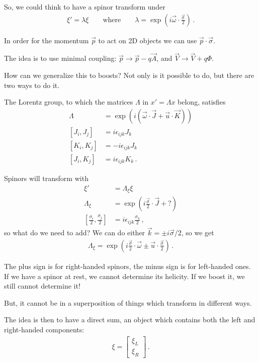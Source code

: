\documentclass[main.tex]{subfiles}
\begin{document}
So, we could think to have a spinor transform under 
%
\begin{align}
\xi ' = \lambda \xi  
\qquad \text{where} \qquad
\lambda = \exp(i \vec{\omega} \cdot \frac{\vec{\sigma}}{2})
\,.
\end{align}

In order for the momentum \(\vec{p}\) to act on 2D objects we can use \(\vec{p} \cdot \vec{\sigma}\). 

The idea is to use minimal coupling: \(\vec{p} \to \vec{p} - q \vec{A}\), and \(\vec{V} \to \vec{V} + q \Phi \). 

How can we generalize this to boosts? 
Not only is it possible to do, but there are two ways to do it. 

The Lorentz group, to which the matrices \(\Lambda \) in \(x' = \Lambda x \) belong, satisfies 
%
\begin{align}
\Lambda &= \exp(i \left(\vec{\omega} \cdot \vec{J} + \vec{u} \cdot \vec{K}\right)) \\
[J_i, J_j] &= i \epsilon_{ijk} J_k \\
[K_i, K_j] &= - i \epsilon_{ijk} J_k \\
[J_i, K_j] &= i \epsilon_{ijk} K_k 
\,.
\end{align}

Spinors will transform with 
%
\begin{align}
\xi ' &= \Lambda_\xi \xi  \\
\Lambda _\xi &= \exp(i \frac{\vec{\sigma}}{2} \cdot \vec{J} + ?)  \\
\left[\frac{\sigma_i}{2}, \frac{\sigma _j}{2}\right] &= i \epsilon_{ijk} \frac{\sigma _k}{2}
\,,
\end{align}
%
so what do we need to add? We can do either \(\vec{k} = \pm i \vec{\sigma} /2\), so we get 
%
\begin{align}
\Lambda _\xi = \exp(i \frac{\vec{\sigma}}{2} \cdot \vec{\omega} \pm \vec{u} \cdot \frac{\vec{\sigma}}{2})
\,.
\end{align}

The plus sign is for right-handed spinors, the minus sign is for left-handed ones.
If we have a spinor at rest, we cannot determine its helicity. 
If we boost it, we still cannot determine it! 

But, it cannot be in a superposition of things which transform in different ways. 

The idea is then to have a direct sum, an object which contains both the left and right-handed components: 
%
\begin{align}
\xi = \left[\begin{array}{c}
\xi _L \\ 
\xi _R
\end{array}\right]
\,.
\end{align}
\end{document}
